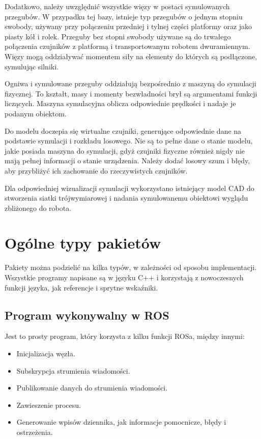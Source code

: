 	Dodatkowo, należy uwzględnić wszystkie więzy w postaci symulowanych przegubów.
	W przypadku tej bazy, istnieje typ przegubów o jednym stopniu swobody, używany przy połączeniu przedniej i tylnej części platformy oraz 
	jako piasty kół i rolek. Przeguby bez stopni swobody używane są do trwałego połączenia czujników z platformą i transportowanym robotem dwuramiennym.
	Więzy mogą oddziaływać momentem siły na elementy do których są podłączone, symulując silniki.

	Ogniwa i symulowane przeguby oddziałują bezpośrednio z maszyną do symulacji fizycznej. 
	To kształt, masy i momenty bezwładności brył są argumentami funkcji liczących.
	Maszyna symulacyjna oblicza odpowiednie prędkości i nadaje je podanym obiektom.

	Do modelu doczepia się wirtualne czujniki, generujące odpowiednie dane na podstawie symulacji i rozkładu losowego.
	Nie są to pełne dane o stanie modelu, jakie posiada maszyna do symulacji, gdyż czujniki fizyczne również nigdy nie mają pełnej informacji o stanie urządzenia.
	Należy dodać losowy szum i błędy, aby przybliżyć ich zachowanie do rzeczywistych czujników.

	Dla odpowiedniej wizualizacji symulacji wykorzystano istniejący model CAD do stworzenia siatki trójwymiarowej i nadania symulowanemu obiektowi wyglądu zbliżonego do robota.

\section{Ogólne typy pakietów}
	Pakiety można podzielić na kilka typów, w zależności od sposobu implementacji.
	Wszystkie programy napisane są w języku C++ i korzystają z nowoczesnych funkcji języka, jak referencje i sprytne wskaźniki.
	
	\subsection{Program wykonywalny w ROS}
		\label{sec:ros_exe}
		Jest to prosty program, który korzysta z kilku funkcji ROSa, między innymi:
		\begin{itemize}
			\item Inicjalizacja węzła.
			\item Subskrypcja strumienia wiadomości.
			\item Publikowanie danych do strumienia wiadomości.
			\item Zawieszenie procesu.
			\item Generowanie wpisów dziennika, jak informacje pomocnicze, błędy i ostrzeżenia.
		\end{itemize}
		
